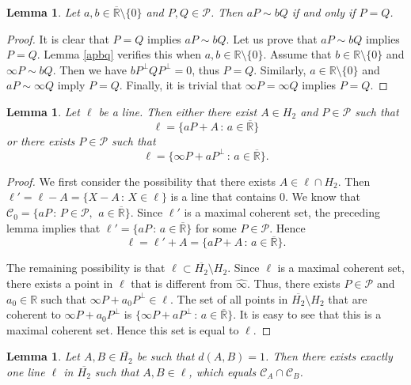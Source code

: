 \documentclass[10pt,a4paper]{amsart}
\newcommand\cC{{\mathcal{C}}}
\newcommand\oH{{\overline{H_2}}}
\newcommand\oi{{\widehat{\infty}}}
\newcommand\oR{{\overline{\mathbb{R}}}}
\newtheorem{lemma}[theorem]{Lemma}
\theoremstyle{definition}
\theoremstyle{remark}
\numberwithin{subsection}{section}
\numberwithin{equation}{section}
\begin{document}
\begin{lemma}\label{pq}
Let $a,b \in {\oR}\setminus\{0\}$ and $P,Q \in \mathcal{P}$. 
Then $aP \sim bQ$ if and only if $P=Q$.
\end{lemma}
\begin{proof}
It is clear that $P=Q$ implies $aP \sim bQ$.
Let us prove that $aP \sim bQ$ implies $P=Q$.
Lemma \ref{apbq} verifies this when $a,b\in \mathbb{R}\setminus\{0\}$. 
Assume that $b\in \mathbb{R}\setminus\{0\}$ and $\infty P\sim bQ$. 
Then we have $bP^\perp QP^\perp =0$, thus $P=Q$. 
Similarly, $a\in \mathbb{R}\setminus\{0\}$ and $a P\sim \infty Q$ imply $P=Q$. 
Finally, it is trivial that $\infty P=\infty Q$ implies $P=Q$.
\end{proof}


\begin{lemma}\label{jojhcer}
Let $\ell$ be a line. Then either there exist $A\in H_2$ and $P \in \mathcal{P}$ such that
\[
\ell = \{ aP+A \, : \, a \in \oR \}
\]
or there exists $P \in \mathcal{P}$ such that
\[
\ell = \{ \infty P + aP^\perp \, : \, a \in {\oR}  \}.
\]
\end{lemma}

\begin{proof}
We first consider the possibility that there exists $A \in \ell \cap H_2$. Then $\ell' = \ell - A = \{ X - A \, : \, X \in \ell \}$ is a line that contains $0$. 
We know that $\mathcal{C}_0 = \{ aP \, : \, P \in \mathcal{P}, \ \, a \in {\oR} \}$. Since $\ell'$ is a maximal coherent set, the preceding lemma implies that $\ell' = \{ aP \, : \, a \in {\oR} \}$ for some $P \in \mathcal{P}$. 
Hence 
\[
\ell = \ell' + A =  \{ aP+A \, : \, a \in \oR \}.
\]

The remaining possibility is that $\ell \subset \oH \setminus H_2$. Since $\ell$ is a maximal coherent set, there exists a point in $\ell$ that is different from ${\oi}$. Thus, there exists $P \in \mathcal{P}$ and $a_0 \in \mathbb{R}$ such that $\infty P + a_0 P^\perp \in \ell$. The set of all points in $ \oH \setminus H_2$ that are coherent to $\infty P + a_0 P^\perp$ is $ \{ \infty P + aP^\perp \, : \, a \in {\oR}  \}$. It is easy to see that this is a maximal coherent set. Hence this set is equal to $\ell$.
\end{proof}

\begin{lemma}\label{simpll}
Let $A,B \in \oH$ be such that $d(A,B) = 1$. Then there exists exactly one line $\ell$ in $\oH$ such that $A,B \in \ell$, which equals $\cC_A\cap \cC_B$.
\end{lemma}
\end{document}
